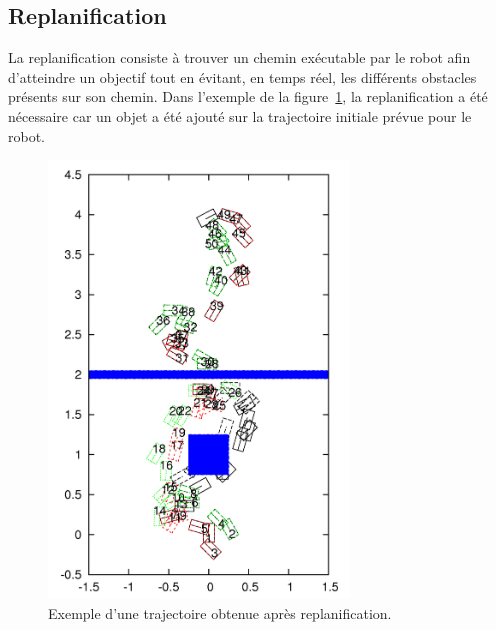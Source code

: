 

\subsection{Replanification}
\label{sub:replanif}


La replanification consiste à trouver un chemin exécutable par le robot afin d'atteindre un objectif tout en évitant, en temps réel, les différents obstacles présents sur son chemin.
Dans l'exemple de la figure~\ref{fig:replan}, la replanification a été nécessaire car un objet a été ajouté sur la trajectoire initiale prévue pour le robot.

\begin{figure}[h]
\begin{center}
\includegraphics[width=8.0cm]{images/replan.png}
\caption{Exemple d'une trajectoire obtenue après replanification.}
\label{fig:replan}
\end{center}
\end{figure}


